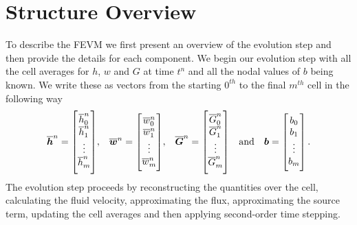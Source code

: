 \section{Structure Overview}
\label{sec:StructOverview}
To describe the FEVM we first present an overview of the evolution step and then provide the details for each component. We begin our evolution step with all the cell averages for $h$, $w$ and $G$ at time $t^n$ and all the nodal values of $b$ being known. We write these as vectors from the starting $0^{th}$ to the final $m^{th}$ cell in the following way
\begin{align*} \overline{\vecn{h}}^n = \begin{bmatrix} \TM
\overline{h}_0^n \\\overline{h}_1^n \\ \vdots \\ \overline{h}_m^n \BM\end{bmatrix} &,& \overline{\vecn{w}}^n = \begin{bmatrix} \TM
\overline{w}_0^n \\\overline{w}_1^n \\ \vdots \\ \overline{w}_m^n \BM \end{bmatrix} &,&  \overline{\vecn{G}}^n = \begin{bmatrix} \TM
\overline{G}_0^n \\\overline{G}_1^n \\ \vdots \\ \overline{G}_m^n \BM \end{bmatrix}& &\text{and}& & \vecn{b} = \begin{bmatrix} \TM
b_{0} \\ b_{1} \\ \vdots \\b_{m} \BM
\end{bmatrix}. \\
\end{align*}
The evolution step proceeds by reconstructing the quantities over the cell, calculating the fluid velocity, approximating the flux, approximating the source term, updating the cell averages and then applying second-order time stepping.

